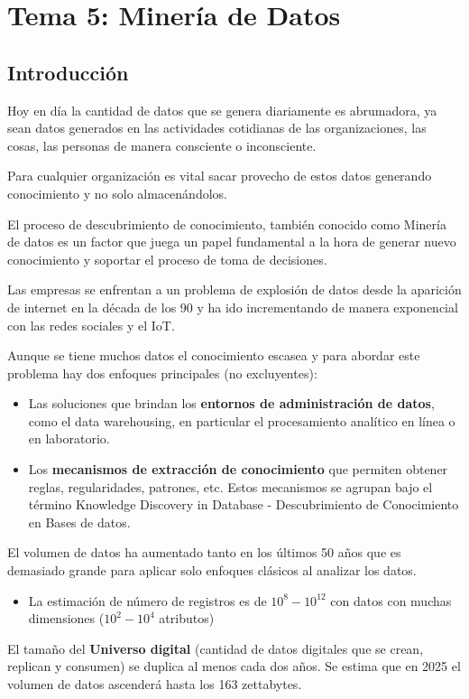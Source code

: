 \documentclass[12pt, twoside, openright]{report} %
\begin{document}
\chapter{Tema 5: Minería de Datos}
\section{Introducción}
Hoy en día la cantidad de datos que se genera diariamente es abrumadora, ya sean datos generados en las actividades cotidianas de las organizaciones, las cosas, las personas de manera consciente o inconsciente.

Para cualquier organización es vital sacar provecho de estos datos generando conocimiento y no solo almacenándolos.

El proceso  de descubrimiento de conocimiento, también conocido como Minería de datos es un factor que juega un papel fundamental a la hora de generar nuevo conocimiento y soportar el proceso de toma de decisiones.

Las empresas se enfrentan a un problema de explosión de datos desde la aparición de internet en la década de los 90 y ha ido incrementando de manera exponencial con las redes sociales y el IoT.

Aunque se tiene muchos datos el conocimiento escasea y para abordar este problema hay dos enfoques principales (no excluyentes):
\begin{itemize}
	\item Las soluciones que brindan los \textbf{entornos de administración de datos}, como el data warehousing, en particular el procesamiento analítico en línea o en laboratorio.
	\item Los \textbf{mecanismos de extracción de conocimiento} que permiten obtener reglas, regularidades, patrones, etc. Estos mecanismos se agrupan bajo el término Knowledge Discovery in Database - Descubrimiento de Conocimiento en Bases de datos.
\end{itemize}

El volumen de datos ha aumentado tanto en los últimos 50 años que es demasiado grande para aplicar solo enfoques clásicos al analizar los datos.
\begin{itemize}
	\item La estimación de número de registros es de $10^8 - 10^{12}$ con datos con muchas dimensiones ($10^2 - 10^4$ atributos)
\end{itemize}

El tamaño del \textbf{Universo digital} (cantidad de datos digitales que se crean, replican y consumen) se duplica al menos cada dos años. Se estima que en 2025 el volumen de datos ascenderá hasta los 163 zettabytes.
\end{document}
